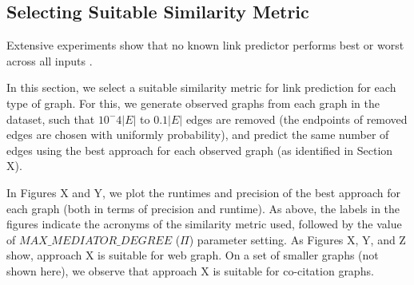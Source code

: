 







\subsection{Selecting Suitable Similarity Metric}

Extensive experiments \cite{ghasemian2020stacking} show that no known link predictor performs best or worst across all inputs \cite{zhou2021progresses}. In this section, we select a suitable similarity metric for link prediction for each type of graph. For this, we generate observed graphs from each graph in the dataset, such that $10^-4|E|$ to $0.1|E|$ edges are removed (the endpoints of removed edges are chosen with uniformly probability), and predict the same number of edges using the best approach for each observed graph (as identified in Section X).

In Figures X and Y, we plot the runtimes and precision of the best approach for each graph (both in terms of precision and runtime). As above, the labels in the figures indicate the acronyms of the similarity metric used, followed by the value of $MAX\_MEDIATOR\_DEGREE$ ($\Pi$) parameter setting. As Figures X, Y, and Z show, approach X is suitable for web graph. On a set of smaller graphs (not shown here), we observe that approach X is suitable for co-citation graphs.


